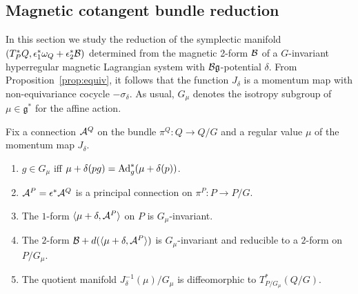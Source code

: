 \documentclass[pdftex]{sigma}
\newcommand{\A}{{\cal A}}
\newcommand{\B}{{\cal B}}
\newcommand{\e}{\epsilon}
\newcommand{\lag}{\mathfrak{g}}
\begin{document}
\subsection{Magnetic cotangent bundle reduction}\label{section5.1}

In this section we study the reduction of the symplectic manifold $(T_P^*Q, \e_1^*\omega_Q +\e^*_2\B)$ determined from the magnetic 2-form $\B$ of a $G$-invariant hyperregular magnetic Lagrangian system with $\B\lag$-potential $\delta$. From Proposition~\ref{prop:equiv}, it follows that the function $J_\delta$ is a momentum map with non-equivariance cocycle $-\sigma_\delta$.  As usual, $G_\mu$ denotes the isotropy subgroup of $\mu\in\lag^*$ for the af\/f\/ine action.


\begin{proposition} Fix a connection $\A^Q$ on the bundle $\pi^Q: Q\to Q/G$ and a regular value $\mu$ of the momentum map $J_\delta$.
\begin{enumerate}\itemsep=0pt
\item[$1.$] $g\in G_\mu$ iff $\mu+\delta(pg)= {\rm Ad}_g^*(\mu+\delta(p))$.
\item[$2.$] $\A^P=\e^*\A^Q$ is a principal connection on $\pi^P:P\to P/G$.
\item[$3.$] The $1$-form $\langle \mu+\delta,\A^P\rangle$ on $P$ is $G_\mu$-invariant.
\item[$4.$]  The $2$-form $\B + d(\langle \mu+\delta,\A^P\rangle)$ is $G_\mu$-invariant and reducible to a $2$-form on $P/G_\mu$.
\item[$5.$] The quotient manifold $J_\delta^{-1}(\mu)/G_\mu$ is diffeomorphic to $T^*_{P/G_\mu}(Q/G)$.
\end{enumerate}
\end{proposition}
\end{document}
